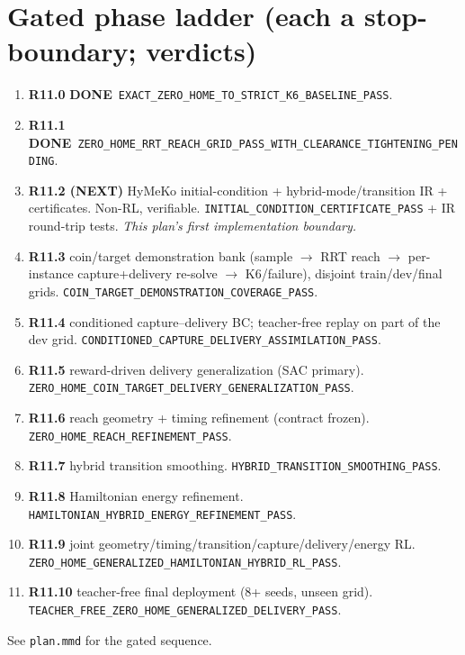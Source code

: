 \documentclass[11pt]{article}
\newcommand{\code}[1]{\texttt{\small #1}}
\newcommand{\done}{\textcolor{green!50!black}{\textbf{DONE}}}
\newcommand{\gate}[1]{\textcolor{blue!55!black}{\texttt{\small #1}}}
\begin{document}
\section{Gated phase ladder (each a stop-boundary; verdicts)}
\begin{enumerate}[nosep,leftmargin=1.7em]
  \item \textbf{R11.0} \done\ \gate{EXACT\_ZERO\_HOME\_TO\_STRICT\_K6\_BASELINE\_PASS}.
  \item \textbf{R11.1} \done\ \gate{ZERO\_HOME\_RRT\_REACH\_GRID\_PASS\_WITH\_CLEARANCE\_TIGHTENING\_PENDING}.
  \item \textbf{R11.2 (NEXT)} HyMeKo initial-condition + hybrid-mode/transition IR + certificates. Non-RL, verifiable.
  \gate{INITIAL\_CONDITION\_CERTIFICATE\_PASS} + IR round-trip tests. \emph{This plan's first implementation boundary.}
  \item \textbf{R11.3} coin/target demonstration bank (sample $\to$ RRT reach $\to$ per-instance capture+delivery
  re-solve $\to$ K6/failure), disjoint train/dev/final grids. \gate{COIN\_TARGET\_DEMONSTRATION\_COVERAGE\_PASS}.
  \item \textbf{R11.4} conditioned capture--delivery BC; teacher-free replay on part of the dev grid.
  \gate{CONDITIONED\_CAPTURE\_DELIVERY\_ASSIMILATION\_PASS}.
  \item \textbf{R11.5} reward-driven delivery generalization (SAC primary).
  \gate{ZERO\_HOME\_COIN\_TARGET\_DELIVERY\_GENERALIZATION\_PASS}.
  \item \textbf{R11.6} reach geometry + timing refinement (contract frozen). \gate{ZERO\_HOME\_REACH\_REFINEMENT\_PASS}.
  \item \textbf{R11.7} hybrid transition smoothing. \gate{HYBRID\_TRANSITION\_SMOOTHING\_PASS}.
  \item \textbf{R11.8} Hamiltonian energy refinement. \gate{HAMILTONIAN\_HYBRID\_ENERGY\_REFINEMENT\_PASS}.
  \item \textbf{R11.9} joint geometry/timing/transition/capture/delivery/energy RL.
  \gate{ZERO\_HOME\_GENERALIZED\_HAMILTONIAN\_HYBRID\_RL\_PASS}.
  \item \textbf{R11.10} teacher-free final deployment (8+ seeds, unseen grid).
  \gate{TEACHER\_FREE\_ZERO\_HOME\_GENERALIZED\_DELIVERY\_PASS}.
\end{enumerate}
See \code{plan.mmd} for the gated sequence.
\end{document}
